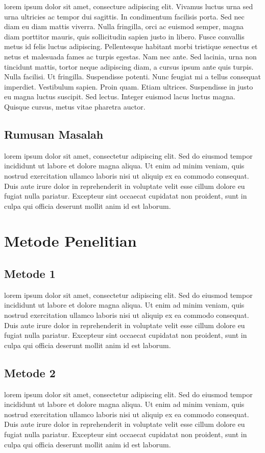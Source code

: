 \documentclass[a4paper]{article}
\begin{document}
lorem ipsum dolor sit amet, consecture adipiscing elit. Vivamus luctus urna sed urna ultricies ac tempor dui sagittis. In condimentum facilisis porta. Sed nec diam eu diam mattis viverra. Nulla fringilla, orci ac euismod semper, magna diam porttitor mauris, quis sollicitudin sapien justo in libero. Fusce convallis metus id felis luctus adipiscing. Pellentesque habitant morbi tristique senectus et netus et malesuada fames ac turpis egestas. Nam nec ante. Sed lacinia, urna non tincidunt mattis, tortor neque adipiscing diam, a cursus ipsum ante quis turpis. Nulla facilisi. Ut fringilla. Suspendisse potenti. Nunc feugiat mi a tellus consequat imperdiet. Vestibulum sapien. Proin quam. Etiam ultrices. Suspendisse in justo eu magna luctus suscipit. Sed lectus. Integer euismod lacus luctus magna. Quisque cursus, metus vitae pharetra auctor.
\subsection{Rumusan Masalah}
lorem ipsum dolor sit amet, consectetur adipiscing elit. Sed do eiusmod tempor incididunt ut labore et dolore magna aliqua. Ut enim ad minim veniam, quis nostrud exercitation ullamco laboris nisi ut aliquip ex ea commodo consequat. Duis aute irure dolor in reprehenderit in voluptate velit esse cillum dolore eu fugiat nulla pariatur. Excepteur sint occaecat cupidatat non proident, sunt in culpa qui officia deserunt mollit anim id est laborum.
\newpage

\section{Metode Penelitian}
\subsection{Metode 1}
lorem ipsum dolor sit amet, consectetur adipiscing elit. Sed do eiusmod tempor incididunt ut labore et dolore magna aliqua. Ut enim ad minim veniam, quis nostrud exercitation ullamco laboris nisi ut aliquip ex ea commodo consequat. Duis aute irure dolor in reprehenderit in voluptate velit esse cillum dolore eu fugiat nulla pariatur. Excepteur sint occaecat cupidatat non proident, sunt in culpa qui officia deserunt mollit anim id est laborum.
\subsection{Metode 2}
lorem ipsum dolor sit amet, consectetur adipiscing elit. Sed do eiusmod tempor incididunt ut labore et dolore magna aliqua. Ut enim ad minim veniam, quis nostrud exercitation ullamco laboris nisi ut aliquip ex ea commodo consequat. Duis aute irure dolor in reprehenderit in voluptate velit esse cillum dolore eu fugiat nulla pariatur. Excepteur sint occaecat cupidatat non proident, sunt in culpa qui officia deserunt mollit anim id est laborum.
\end{document}
